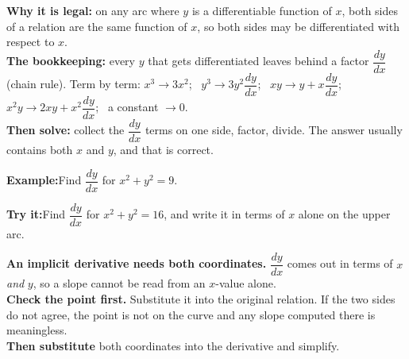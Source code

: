 \documentclass[12pt]{article}
\begin{document}


\begin{formulabox}
\textbf{Why it is legal:} on any arc where $y$ is a differentiable function of $x$,
both sides of a relation are the same function of $x$, so both sides may be
differentiated with respect to $x$.\\[3pt]
\textbf{The bookkeeping:} every $y$ that gets differentiated leaves behind a factor
$\dfrac{dy}{dx}$ (chain rule). Term by term:
$x^{3} \to 3x^{2}$; \ $y^{3} \to 3y^{2}\dfrac{dy}{dx}$; \
$xy \to y + x\dfrac{dy}{dx}$; \ $x^{2}y \to 2xy + x^{2}\dfrac{dy}{dx}$; \
a constant $\to 0$.\\[3pt]
\textbf{Then solve:} collect the $\dfrac{dy}{dx}$ terms on one side, factor,
divide. The answer usually contains both $x$ and $y$, and that is correct.
\end{formulabox}

\begin{examplebox}
\textbf{Example:}\quad Find $\dfrac{dy}{dx}$ for $x^{2} + y^{2} = 9$.
\end{examplebox}

\begin{tryitbox}
\textbf{Try it:}\quad Find $\dfrac{dy}{dx}$ for $x^{2} + y^{2} = 16$, and write it
in terms of $x$ alone on the upper arc.\\[2pt]
\end{tryitbox}


\begin{formulabox}
\textbf{An implicit derivative needs both coordinates.} $\dfrac{dy}{dx}$ comes out
in terms of $x$ \emph{and} $y$, so a slope cannot be read from an $x$-value
alone.\\[3pt]
\textbf{Check the point first.} Substitute it into the original relation. If the
two sides do not agree, the point is not on the curve and any slope computed there
is meaningless.\\[3pt]
\textbf{Then substitute} both coordinates into the derivative and simplify.
\end{formulabox}
\end{document}
